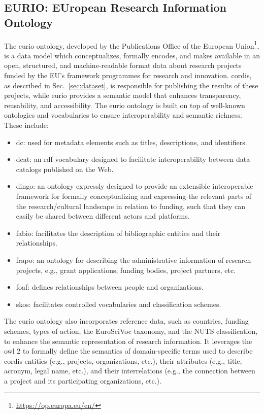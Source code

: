 \subsection*{EURIO: EUropean Research Information Ontology}
The \gls{eurio} ontology, developed by the Publications Office of the European Union\footnote{\url{https://op.europa.eu/en/}}, is a data model which conceptualizes, formally encodes, and makes available in an open, structured, and machine-readable format data about research projects funded by the EU's framework programmes for research and innovation.
\gls{cordis}, as described in Sec.~\ref{sec:dataset}, is responsible for publishing the results of these projects, while \gls{eurio} provides a semantic model that enhances transparency, reusability, and accessibility.
The \gls{eurio} ontology is built on top of well-known ontologies and vocabularies to ensure interoperability and semantic richness.
These include:
\begin{itemize}
    \item \gls{dc}: used for metadata elements such as titles, descriptions, and identifiers.
    \item \gls{dcat}: an \gls{rdf} vocabulary designed to facilitate interoperability between data catalogs published on the Web.
    \item \gls{dingo}: an ontology expressly designed to provide an extensible interoperable framework for formally conceptualizing and expressing the relevant parts of the research/cultural landscape in relation to funding, such that they can easily be shared between different actors and platforms.
    \item \gls{fabio}: facilitates the description of bibliographic entities and their relationships.
    \item \gls{frapo}: an ontology for describing the administrative information of research projects, e.g., grant applications, funding bodies, project partners, etc.
    \item \gls{foaf}: defines relationships between people and organizations.
    \item \gls{skos}: facilitates controlled vocabularies and classification schemes.
\end{itemize}

The \gls{eurio} ontology also incorporates reference data, such as countries, funding schemes, types of action, the EuroSciVoc taxonomy, and the NUTS classification, to enhance the semantic representation of research information.
It leverages the \gls{owl} 2 to formally define the semantics of domain-specific terms used to describe \gls{cordis} entities (e.g., projects, organizations, etc.), their attributes (e.g., title, acronym, legal name, etc.), and their interrelations (e.g., the connection between a project and its participating organizations, etc.).

